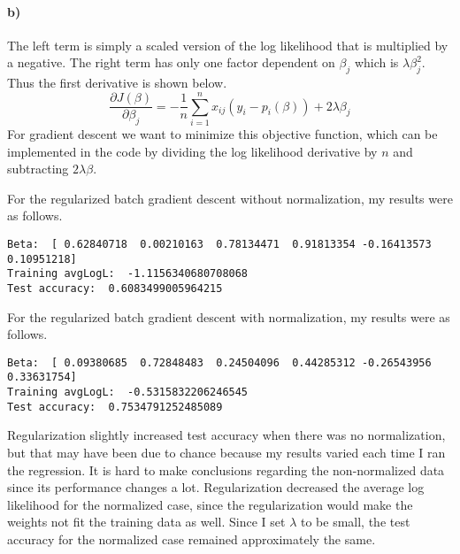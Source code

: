 \documentclass[12pt]{article}
\begin{document}
\paragraph{b)}

The left term is simply a scaled version of the log likelihood that is multiplied by a negative. The right term has only
one factor dependent on \(\beta_j\) which is \(\lambda \beta_j^2\). Thus the first derivative is shown below.
\[\frac{\partial J(\beta)}{\partial\beta_j} = -\frac{1}{n}\sum_{i=1}^n x_{ij}(y_i-p_i(\beta)) + 2\lambda \beta_{j}\]
For gradient descent we want to minimize this objective function, which can be implemented in the code by dividing the
log likelihood derivative by \(n\) and subtracting \(2\lambda\beta\).

For the regularized batch gradient descent without normalization, my results were as follows.
\scriptsize
\begin{verbatim}
Beta:  [ 0.62840718  0.00210163  0.78134471  0.91813354 -0.16413573  0.10951218]
Training avgLogL:  -1.1156340680708068
Test accuracy:  0.6083499005964215
\end{verbatim}
\normalsize
For the regularized batch gradient descent with normalization, my results were as follows.
\scriptsize
\begin{verbatim}
Beta:  [ 0.09380685  0.72848483  0.24504096  0.44285312 -0.26543956  0.33631754]
Training avgLogL:  -0.5315832206246545
Test accuracy:  0.7534791252485089
\end{verbatim}
\normalsize
Regularization slightly increased test accuracy when there was no normalization, but that may have been due to chance because my results varied
each time I ran the regression. It is hard to make conclusions regarding the non-normalized data since its performance changes a lot.
Regularization decreased the average log likelihood for the normalized case, since the regularization would make the weights
not fit the training data as well. Since I set \(\lambda\) to be small, the test accuracy for the normalized case remained approximately the same.
\end{document}

